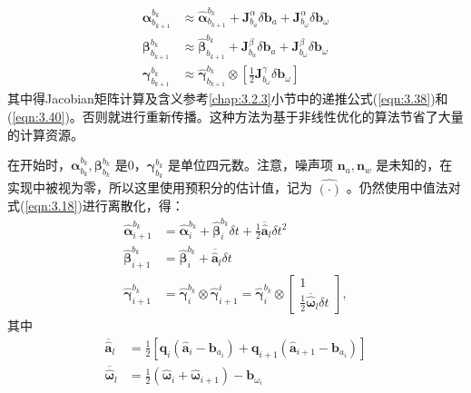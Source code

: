 \begin{equation}
\label{eqn:3.18}
\begin{aligned}
\bm{\alpha}_{b_{k+1}}^{b_{k}} & \approx \hat{\bm{\alpha}}_{b_{k+1}}^{b_{k}}+\bm{J}_{{b}_{a}}^{\alpha} \delta \mathbf{b}_{a}+\bm{J}_{{b}_{\omega}}^{\alpha} \delta \mathbf{b}_{\omega} \\  
\bm{\beta}_{b_{k+1}}^{b_{k}}  & \approx \hat{\bm{\beta}}_{b_{k+1}}^{b_{k}}+\bm{J}_{b_{a}}^{\beta} \delta \mathbf{b}_{a} + \bm{J}_{b_{\omega}}^{\beta} \delta \mathbf{b}_{\omega} \\
\bm{\gamma}_{b_{k+1}}^{b_{k}} & \approx \hat{\bm{\gamma}}_{b_{k+1}}^{b_{k}} \otimes\left[\frac{1}{2} \bm{J}_{b_{\omega}}^{\gamma} \delta \mathbf{b}_{\omega}\right]
\end{aligned}
\end{equation}
其中得Jacobian矩阵计算及含义参考\ref{chap:3.2.3}小节中的递推公式(\ref{eqn:3.38})和(\ref{eqn:3.40})。否则就进行重新传播。这种方法为基于非线性优化的算法节省了大量的计算资源。

在开始时，$\bm{\alpha}_{b_k}^{b_k},\bm{\beta}_{b_k}^{b_k} $ 是0，$\bm{\gamma}_{b_k}^{b_k} $ 是单位四元数。注意，噪声项 $\mathbf{n}_a,\mathbf{n}_w $ 是未知的，在实现中被视为零，所以这里使用预积分的估计值，记为 $\hat{(\cdot)} $ 。仍然使用中值法对式(\ref{eqn:3.18})进行离散化，得：
\begin{equation}
\label{eqn:3.19}
\begin{aligned}
\hat{\bm{\alpha}}_{i+1}^{b_{k}} &= \hat{\bm{\alpha}}_{i}^{b_{k}}+\hat{\bm{\beta}}_{i}^{b_{k}} \delta t+\frac{1}{2} \overline{\hat{\mathbf{a}}}_{l} \delta t^{2} \\
\hat{\bm{\beta}}_{i+1}^{b_{k}}  &= \hat{\bm{\beta}}_{i}^{b_{k}}+\overline{\hat{\mathbf{a}}}_{l} \delta t \\
\hat{\bm{\gamma}}_{i+1}^{b_{k}} &= \hat{\bm{\gamma}}_{i}^{b_{k}} \otimes \hat{\bm{\gamma}}_{i+1}^{i}=\hat{\bm{\gamma}}_{i}^{b_{k}} \otimes \begin{bmatrix} 1\\ \frac{1}{2} \overline{\hat{\bm{\omega}}}_{l} \delta t\end{bmatrix},
\end{aligned}
\end{equation}
其中
\begin{equation}
\label{eqn:3.20}
\begin{aligned}
\overline{\hat{\mathbf{a}}}_{l} &= \frac{1}{2}\left[\mathbf{q}_{i}\left(\hat{ \mathbf{a}}_{i}-\mathbf{b}_{a_{i}}\right) +\mathbf{q}_{i+1}\left(\hat{\mathbf{a}}_{i+1}-\mathbf{b}_{a_{i}}\right) \right] \\ 
\overline{\hat{{\bm{\omega}}}}_{l}   &= \frac{1}{2}\left(\hat{\bm{\omega}}_{i}+\hat{\bm{\omega}}_{i+1}\right)-\mathbf{b}_{\omega_{i}}
\end{aligned}
\end{equation}
